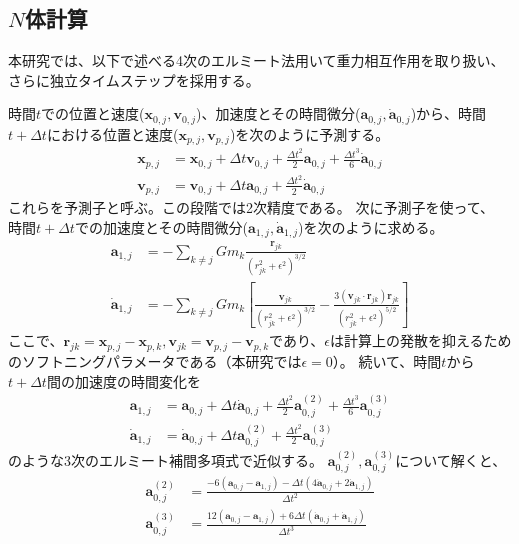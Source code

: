 \documentclass[a4paper,10pt,oneside,twocolumn,notitlepage,final]{jarticle}
\begin{document}
\subsection{$N$体計算}
本研究では、以下で述べる4次のエルミート法\citep{Makino1992}用いて重力相互作用を取り扱い、さらに独立タイムステップを採用する。

時間$t$での位置と速度(${\bm x}_{0,j},{\bm v}_{0,j}$)、加速度とその時間微分(${\bm a}_{0,j},\dot{{\bm a}}_{0,j}$)から、時間$t + \Delta t$における位置と速度(${\bm x}_{p,j} , {\bm v}_{p,j}$)を次のように予測する。
\begin{align}
{\bm x}_{p,j} &= {\bm x}_{0,j} + \Delta t {\bm v}_{0,j} + \frac{\Delta t ^2}{2} {\bm a}_{0,j} + \frac{\Delta t ^3}{6} \dot{{\bm a}}_{0,j}\\
{\bm v}_{p,j} &= {\bm v}_{0,j} + \Delta t {\bm a}_{0,j} + \frac{\Delta t ^2}{2} \dot{{\bm a}}_{0,j}
\end{align}
これらを予測子と呼ぶ。この段階では2次精度である。
次に予測子を使って、 時間$t + \Delta t$での加速度とその時間微分(${\bm a}_{1,j},\dot{{\bm a}}_{1,j}$)を次のように求める。
\begin{align}
{\bm a}_{1,j} &= - \sum_{k \not= j} G m_k \frac{{\bm r}_{jk}}{(r_{jk}^2 + \epsilon^2)^{3/2}}\label{eq:a1j}\\
\dot{{\bm a}}_{1,j} &= - \sum_{k \not= j} G m_k \left[ \frac{{\bm v}_{jk}}{(r_{jk}^2 + \epsilon^2)^{3/2}} - \frac{3 ( {\bm v}_{jk} \cdot {\bm r}_{jk} ) {\bm r}_{jk} }{(r_{jk}^2 + \epsilon^2)^{5/2}} \right]\label{eq:adot1j}
\end{align}
ここで、${\bm r}_{jk} = {\bm x}_{p,j} - {\bm x}_{p,k},{\bm v}_{jk} = {\bm v}_{p,j} - {\bm v}_{p,k}$であり、$\epsilon$は計算上の発散を抑えるためのソフトニングパラメータである（本研究では$\epsilon=0$）。
続いて、時間$t$から$t+\Delta t$間の加速度の時間変化を
\begin{align}
{\bm a}_{1,j} &= {\bm a}_{0,j} + \Delta t \dot{{\bm a}}_{0,j} + \frac{\Delta t ^2}{2} {\bm a}_{0,j}^{(2)} + \frac{\Delta t ^3}{6} {\bm a}_{0,j}^{(3)}\\
\dot{{\bm a}}_{1,j} &= \dot{{\bm a}}_{0,j} + \Delta t {\bm a}_{0,j}^{(2)} + \frac{\Delta t ^2}{2} {\bm a}_{0,j}^{(3)}
\end{align}
のような3次のエルミート補間多項式で近似する。
${\bm a}_{0,j}^{(2)},{\bm a}_{0,j}^{(3)}$について解くと、
\begin{align}
{\bm a}_{0,j}^{(2)} &= \frac{- 6 ({\bm a}_{0,j} - {\bm a}_{1,j}) - \Delta t (4 \dot{{\bm a}}_{0,j} + 2 \dot{{\bm a}}_{1,j})}{\Delta t ^2}\\
{\bm a}_{0,j}^{(3)} &= \frac{12 ({\bm a}_{0,j} - {\bm a}_{1,j}) + 6 \Delta t (\dot{{\bm a}}_{0,j} + \dot{{\bm a}}_{1,j})}{\Delta t ^3}
\end{align}
\end{document}
